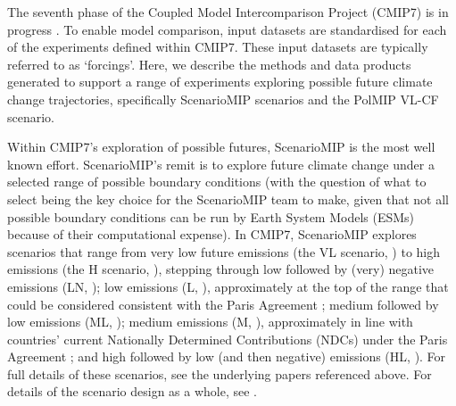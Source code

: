 The seventh phase of the Coupled Model Intercomparison Project (CMIP7) is in progress \citep{dunne_cmip7_2025}.
To enable model comparison, input datasets are standardised for each of the experiments defined within CMIP7.
These input datasets are typically referred to as `forcings'.
Here, we describe the methods and data products
generated to support a range of experiments exploring possible future climate change trajectories,
specifically ScenarioMIP scenarios and the PolMIP VL-CF scenario.

Within CMIP7's exploration of possible futures, ScenarioMIP \citep{van-vuuren_scenariomip_2026,riahi_new-ssps-overview_2026} is the most well known effort.
ScenarioMIP's remit is to explore future climate change under a selected range of possible boundary conditions
(with the question of what to select being the key choice for the ScenarioMIP team to make,
given that not all possible boundary conditions can be run by Earth System Models (ESMs) because of their computational expense).
In CMIP7, ScenarioMIP explores scenarios
that range from very low future emissions (the VL scenario, \citealp{kohler-schindler_vl-marker_2026})
to high emissions (the H scenario, \citealp{george_h-marker_2026}),
stepping through
low followed by (very) negative emissions (LN, \citealp{fujimori_ln-marker_2026});
low emissions (L, \citealp{fricko_l-marker_2026}), approximately at the top of the range that could be considered consistent with the Paris Agreement \citep{unfccc_paris-agreement_2015};
medium followed by low emissions (ML, \citealp{baptista_ml-marker_2026});
medium emissions (M, \citealp{hooijschuur_m-marker_2026}), approximately in line with countries' current Nationally Determined Contributions (NDCs) under the Paris Agreement \citep{unfccc_paris-agreement_2015};
and high followed by low (and then negative) emissions (HL, \citealp{aleluia-reis_hl-marker_2026}).
For full details of these scenarios, see the underlying papers referenced above.
For details of the scenario design as a whole, see \citet{van-vuuren_scenariomip_2026,riahi_new-ssps-overview_2026}.

